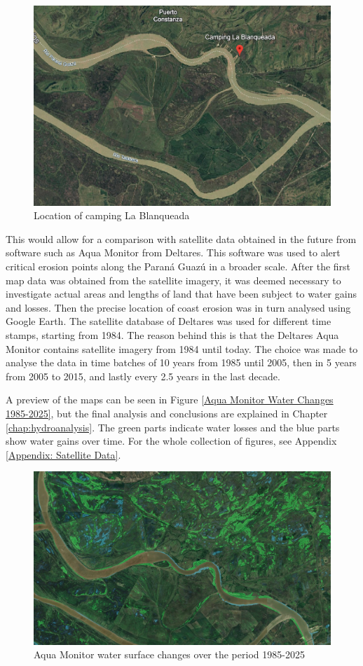\begin{figure}[H]
    \centering
    \includegraphics[width=0.70\linewidth]{figures/ch5/Camping Blanqueada.png}
    \caption{Location of camping La Blanqueada \autocite{googleGoogleEarth2025}}
    \label{fig:Camping Blanqueada}
\end{figure}

This would allow for a comparison with satellite data obtained in the future from software such as Aqua Monitor from Deltares. This software was used to alert critical erosion points along the Paraná Guazú in a broader scale. After the first map data was obtained from the satellite imagery, it was deemed necessary to investigate actual areas and lengths of land that have been subject to water gains and losses. Then the precise location of coast erosion was in turn analysed using Google Earth. The satellite database of Deltares was used for different time stamps, starting from 1984. The reason behind this is that the Deltares Aqua Monitor contains satellite imagery from 1984 until today. The choice was made to analyse the data in time batches of 10 years from 1985 until 2005, then in 5 years from 2005 to 2015, and lastly every 2.5 years in the last decade.

A preview of the maps can be seen in Figure \ref{Aqua Monitor Water Changes 1985-2025}, but the final analysis and conclusions are explained in Chapter \ref{chap:hydroanalysis}. The green parts indicate water losses and the blue parts show water gains over time. For the whole collection of figures, see Appendix \ref{Appendix: Satellite Data}.

\begin{figure}[H]
    \centering
    \includegraphics[width=0.75\linewidth]{figures/ch4/1985-2025.jpg}
    \caption{Aqua Monitor water surface changes over the period 1985-2025 \autocite{googleGoogleEarth2025}}
\end{figure}
\label{Aqua Monitor Water Changes 1985-2025}

